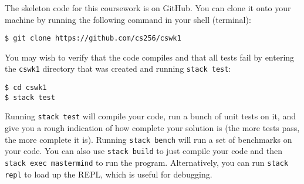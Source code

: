 \documentclass{cs256-shared/cs256}
\begin{document}
The skeleton code for this coursework is on GitHub. You can clone it onto your machine by running the following command in your shell (terminal):
\begin{verbatim}
$ git clone https://github.com/cs256/cswk1
\end{verbatim}
You may wish to verify that the code compiles and that all tests fail by entering the \texttt{cswk1} directory that was created and running \texttt{stack test}:
\begin{verbatim}
$ cd cswk1
$ stack test
\end{verbatim}
Running \texttt{stack test} will compile your code, run a bunch of unit tests on it, and give you a rough indication of how complete your solution is (the more tests pass, the more complete it is). Running \texttt{stack bench} will run a set of benchmarks on your code. You can also use \texttt{stack build} to just compile your code and then \texttt{stack exec mastermind} to run the program. Alternatively, you can run \texttt{stack repl} to load up the REPL, which is useful for debugging.
\end{document}

